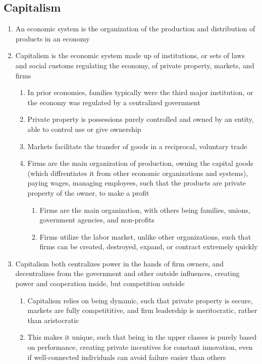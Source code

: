 \subsection{Capitalism}
\begin{enumerate}
\item An economic system is the organization of the production and distribution of products in an economy
\item Capitalism is the economic system made up of institutions, or sets of laws and social customs regulating the economy, of private property, markets, and firms
\begin{enumerate}
\item In prior economies, families typically were the third major institution, or the economy was regulated by a centralized government
\item Private property is possessions purely controlled and owned by an entity, able to control use or give ownership
\item Markets facilitate the transfer of goods in a reciprocal, voluntary trade
\item Firms are the main organization of production, owning the capital goods (which diffrentiates it from other economic organizations and systems), paying wages, managing employees, such that the products are private property of the owner, to make a profit
\begin{enumerate}
\item Firms are the main organization, with others being families, unions, government agencies, and non-profits
\item Firms utilize the labor market, unlike other organizations, such that firms can be created, destroyed, expand, or contract extremely quickly
\end{enumerate} 
\end{enumerate}
\item Capitalism both centralizes power in the hands of firm owners, and decentralizes from the government and other outside influences, creating power and cooperation inside, but competition outside
\begin{enumerate}
\item Capitalism relies on being dynamic, such that private property is secure, markets are fully competititive, and firm leadership is meritocratic, rather than aristocratic
\item This makes it unique, such that being in the upper classes is purely based on performance, creating private incentives for constant innovation, even if well-connected individuals can avoid failure easier than others

\end{enumerate}
\end{enumerate}
